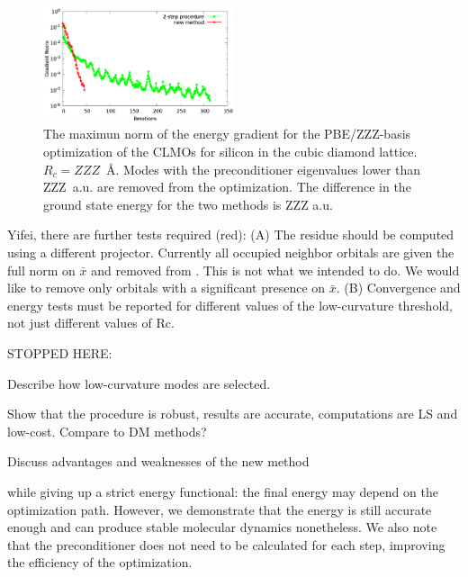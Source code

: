 \documentclass[aps,prl,twocolumn,reprint,amsmath,amssymb]{revtex4-1}
\begin{document}
\begin{figure}
\centering
\includegraphics[width=0.5\textwidth]{convergence}
\caption{The maximun norm of the energy gradient for the PBE/ZZZ-basis optimization of the CLMOs for silicon in the cubic diamond lattice. $R_c = ZZZ$~{\AA}. Modes with the preconditioner eigenvalues lower than ZZZ~a.u. are removed from the optimization. The difference in the ground state energy for the two methods is ZZZ a.u.}
\label{fig:convergence}
\end{figure}

\new Yifei, there are further tests required (red): 
(A) The residue should be computed using a different projector. Currently all occupied neighbor orbitals are given the full norm on $\bar{x}$ and removed from . This is not what we intended to do. We would like to remove only orbitals with a significant presence on $\bar{x}$.
(B) Convergence and energy tests must be reported for different values of the low-curvature threshold, not just different values of Rc.\old

STOPPED HERE: 

Describe how low-curvature modes are selected.

Show that the procedure is robust, results are accurate, computations are LS and low-cost. Compare to DM methods?

Discuss advantages and weaknesses of the new method

while giving up a strict energy functional: the final energy may depend on the optimization path. However, we demonstrate that the energy is still accurate enough and can produce stable molecular dynamics nonetheless.
We also note that the preconditioner does not need to be calculated for each step, improving the efficiency of the optimization. 
\end{document}
